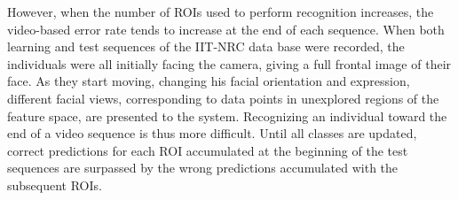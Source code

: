 However, when the number of ROIs used to perform recognition increases, the video-based error rate tends to increase at the end of each sequence.
When both learning and test sequences of the IIT-NRC data base were recorded, the individuals were all initially facing the camera, giving a full frontal image of their face.
As they start moving, changing his facial orientation and expression, different facial views, corresponding to data points in unexplored regions of the feature space, are presented to the system.
Recognizing an individual toward the end of a video sequence is thus more difficult.
Until all classes are updated, correct predictions for each ROI accumulated at the beginning of the test sequences are surpassed by the wrong predictions accumulated with the subsequent ROIs.

